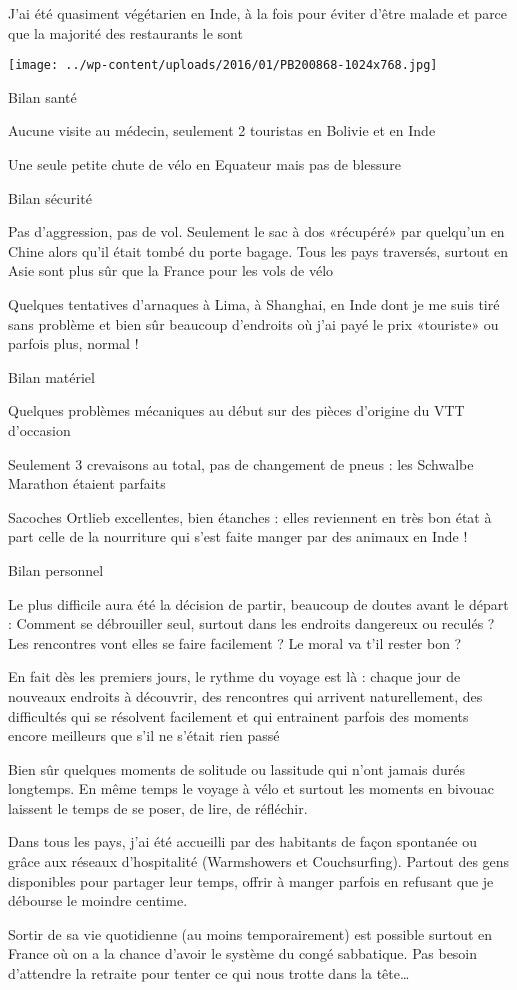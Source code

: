  J'ai été quasiment végétarien en Inde, à la fois pour éviter d'être malade et parce que la majorité des restaurants le sont 

 

\begin{center} \texttt{[image: ../wp-content/uploads/2016/01/PB200868-1024x768.jpg]} \end{center}

 

 Bilan santé 

 Aucune visite au médecin, seulement 2 touristas en Bolivie et en Inde 

 Une seule petite chute de vélo en Equateur mais pas de blessure

 Bilan sécurité 

 Pas d'aggression, pas de vol. Seulement le sac à dos «récupéré» par quelqu'un en Chine alors qu'il était tombé du porte bagage. Tous les pays traversés, surtout en Asie sont plus sûr que la France pour les vols de vélo 

 Quelques tentatives d'arnaques à Lima, à Shanghai, en Inde dont je me suis tiré sans problème et bien sûr beaucoup d'endroits où j'ai payé le prix «touriste» ou parfois plus, normal !

 Bilan matériel 

 Quelques problèmes mécaniques au début sur des pièces d'origine du VTT d'occasion 

 Seulement 3 crevaisons au total, pas de changement de pneus : les Schwalbe Marathon étaient parfaits 

 Sacoches Ortlieb excellentes, bien étanches : elles reviennent en très bon état à part celle de la nourriture qui s'est faite manger par des animaux en Inde !

 Bilan personnel 

 Le plus difficile aura été la décision de partir, beaucoup de doutes avant le départ : Comment se débrouiller seul, surtout dans les endroits dangereux ou reculés ? Les rencontres vont elles se faire facilement ? Le moral va t'il rester bon ?

 En fait dès les premiers jours, le rythme du voyage est là : chaque jour de nouveaux endroits à découvrir, des rencontres qui arrivent naturellement, des difficultés qui se résolvent facilement et qui entrainent parfois des moments encore meilleurs que s'il ne s'était rien passé

 Bien sûr quelques moments de solitude ou lassitude qui n'ont jamais durés longtemps. En même temps le voyage à vélo et surtout les moments en bivouac laissent le temps de se poser, de lire, de réfléchir.

 Dans tous les pays, j'ai été accueilli par des habitants de façon spontanée ou grâce aux réseaux d'hospitalité (Warmshowers et Couchsurfing). Partout des gens disponibles pour partager leur temps, offrir à manger parfois en refusant que je débourse le moindre centime.

 Sortir de sa vie quotidienne (au moins temporairement) est possible surtout en France où on a la chance d'avoir le système du congé sabbatique. Pas besoin d'attendre la retraite pour tenter ce qui nous trotte dans la tête…


 
 
